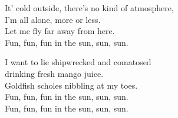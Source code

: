 

\nv It' cold outside, there's no kind of atmosphere,\\
I'm all alone, more or less.\\
Let me fly far away from here.\\
Fun, fun, fun in the sun, sun, sun.
\vspace{20pt}

\nv I want to lie \mm{}shipwrecked and comatosed\\
drinking fresh mango juice.\\
Goldfish scholes nibbling at my toes.\\
Fun, fun, fun in the sun, sun, sun.\\
Fun, fun, fun in the sun, sun, sun.


